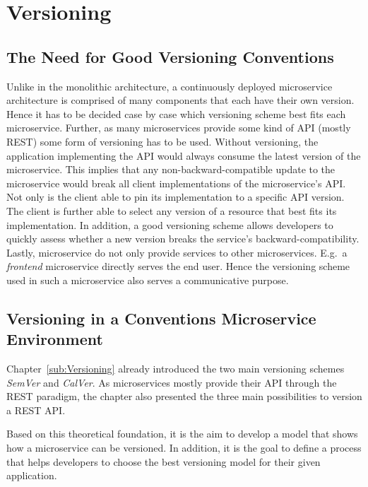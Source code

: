 
\section{Versioning}%
\label{sec:Versioning}

\subsection{The Need for Good Versioning Conventions}%
\label{sub:The_Need_for_Good_Versioning_Conventions}
Unlike in the monolithic architecture, a continuously deployed microservice
architecture is comprised of many components that each have their own version.
Hence it has to be decided case by case which versioning scheme best fits each
microservice. Further, as many microservices provide some kind of \ac{API}
(mostly \ac{REST}) some form of versioning has to be used. Without versioning,
the application implementing the \ac{API} would always consume the latest
version of the microservice. This implies that any non-backward-compatible
update to the microservice would break all client implementations of the
microservice's \ac{API}. Not only is the client able to pin its implementation
to a specific \ac{API} version. The client is further able to select any
version of a resource that best fits its implementation. In addition, a good
versioning scheme allows developers to quickly assess whether a new version
breaks the service's backward-compatibility. Lastly, microservice do not only
provide services to other microservices. E.g.\ a \textit{frontend} microservice
directly serves the end user. Hence the versioning scheme used in such a
microservice also serves a communicative purpose.

\subsection{Versioning in a Conventions Microservice Environment}%
\label{sub:Versioning_in_a_Microservice_Environment}
Chapter~\ref{sub:Versioning} already introduced the two main versioning schemes
\textit{SemVer} and \textit{CalVer}. As microservices mostly provide their
\ac{API} through the \ac{REST} paradigm, the chapter also presented the three
main possibilities to version a \ac{REST} \ac{API}.

Based on this theoretical foundation, it is the aim to develop a model that
shows how a microservice can be versioned. In addition, it is the goal to
define a process that helps developers to choose the best versioning model for
their given application.

